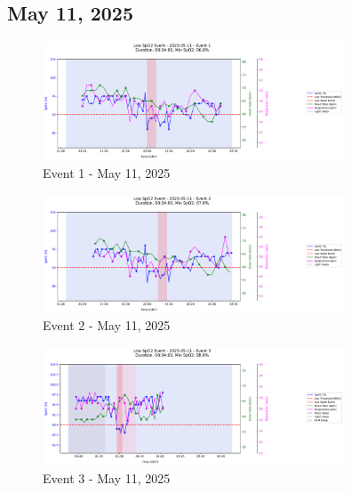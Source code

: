 \documentclass{article}
\begin{document}
\subsection{May 11, 2025}
\begin{figure}[htbp]
    \centering
    \includegraphics[width=0.8\textwidth]{images/2025-05-11_event_1.png}
    \caption{Event 1 - May 11, 2025}
\end{figure}
\begin{figure}[htbp]
    \centering
    \includegraphics[width=0.8\textwidth]{images/2025-05-11_event_2.png}
    \caption{Event 2 - May 11, 2025}
\end{figure}
\begin{figure}[htbp]
    \centering
    \includegraphics[width=0.8\textwidth]{images/2025-05-11_event_3.png}
    \caption{Event 3 - May 11, 2025}
\end{figure}
\clearpage
\end{document}
